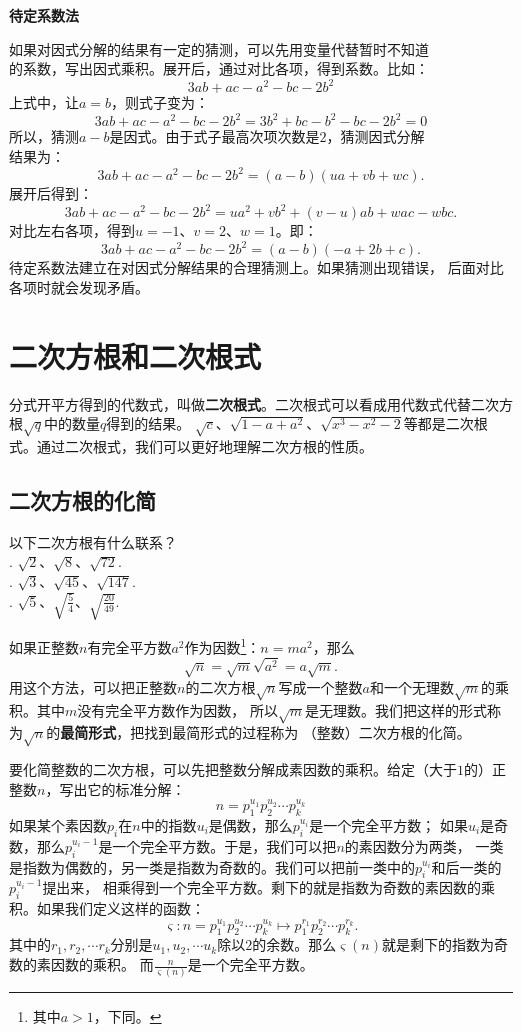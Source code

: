 \documentclass[12pt,UTF8]{ctexbook}
\begin{document}
\noindent \textbf{待定系数法}

\indent 如果对因式分解的结果有一定的猜测，可以先用变量代替暂时不知道\\
\indent 的系数，写出因式乘积。展开后，通过对比各项，得到系数。比如：
$$ 3ab + ac - a^2- bc -2b^2 $$
\indent 上式中，让$a = b$，则式子变为：
$$ 3ab + ac - a^2- bc -2b^2 = 3b^2 + bc - b^2- bc -2b^2 = 0$$
\indent 所以，猜测$a - b$是因式。由于式子最高次项次数是$2$，猜测因式分解\\
\indent 结果为：
$$ 3ab + ac - a^2- bc -2b^2 = (a - b)(ua + vb + wc).$$
\indent 展开后得到：
$$ 3ab + ac - a^2- bc -2b^2 = ua^2 + vb^2 + (v - u)ab + wac - wbc. $$
\indent 对比左右各项，得到$u = -1$、$v = 2$、$w = 1$。即：
$$ 3ab + ac - a^2- bc -2b^2 = (a - b)(-a + 2b + c).$$
\indent 待定系数法建立在对因式分解结果的合理猜测上。如果猜测出现错误，
\indent 后面对比各项时就会发现矛盾。


\chapter{二次方根和二次根式}
分式开平方得到的代数式，叫做\textbf{二次根式}。二次根式可以看成用代数式代替二次方根$\sqrt{q}$中的数量$q$得到的结果。
$\sqrt{c}$、$\sqrt{1 - a + a^2}$、$\sqrt{x^3 - x^2 - 2}$等都是二次根式。通过二次根式，我们可以更好地理解二次方根的性质。

\section{二次方根的化简}
\begin{sk}\label{sk:3-0-0}
    以下二次方根有什么联系？\\
    . $\sqrt{2}$、$\sqrt{8}$、$\sqrt{72}$.\\
    . $\sqrt{3}$、$\sqrt{45}$、$\sqrt{147}$.\\
    . $\sqrt{5}$、$\sqrt{\frac{5}{4}}$、$\sqrt{\frac{20}{49}}$.
\end{sk}
如果正整数$n$有完全平方数$a^2$作为因数\footnote{其中$a>1$，下同。}：$n = ma^2$，那么
$$\sqrt{n} = \sqrt{m}\sqrt{a^2} = a\sqrt{m}.$$
用这个方法，可以把正整数$n$的二次方根$\sqrt{n}$写成一个整数$a$和一个无理数$\sqrt{m}$的乘积。其中$m$没有完全平方数作为因数，
所以$\sqrt{m}$是无理数。我们把这样的形式称为$\sqrt{n}$的\textbf{最简形式}，把找到最简形式的过程称为
（整数）二次方根的化简。

要化简整数的二次方根，可以先把整数分解成素因数的乘积。给定（大于$1$的）正整数$n$，写出它的标准分解：
$$n = p_1^{u_1} p_2^{u_2} \cdots p_k^{u_k}$$
如果某个素因数$p_i$在$n$中的指数$u_i$是偶数，那么$p_i^{u_i}$是一个完全平方数；
如果$u_i$是奇数，那么$p_i^{u_i-1}$是一个完全平方数。于是，我们可以把$n$的素因数分为两类，
一类是指数为偶数的，另一类是指数为奇数的。我们可以把前一类中的$p_i^{u_i}$和后一类的$p_i^{u_i-1}$提出来，
相乘得到一个完全平方数。剩下的就是指数为奇数的素因数的乘积。如果我们定义这样的函数：
$$ \varsigma: n = p_1^{u_1} p_2^{u_2} \cdots p_k^{u_k} \mapsto p_1^{r_1} p_2^{r_2} \cdots p_k^{r_k}. $$
其中的$r_1, r_2, \cdots r_k$分别是$u_1, u_2, \cdots u_k$除以$2$的余数。那么$\varsigma(n)$就是剩下的指数为奇数的素因数的乘积。
而$\frac{n}{\varsigma(n)}$是一个完全平方数。
\end{document}
